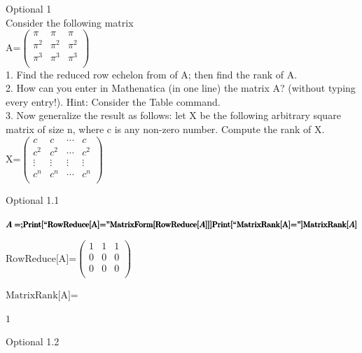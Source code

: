 \documentclass{article}
\begin{document}
Optional 1\\
Consider the following matrix\\
A=\(\left(
\begin{array}{ccc}
 \pi  & \pi  & \pi  \\
 \pi ^2 & \pi ^2 & \pi ^2 \\
 \pi ^3 & \pi ^3 & \pi ^3 \\
\end{array}
\right)\)\\
1. Find the reduced row echelon from of A; then find the rank of A.\\
2. How can you enter in Mathenatica (in one line) the matrix A? (without typing every entry!). Hint: Consider the Table command.\\
3. Now generalize the result as follows: let X be the following arbitrary square matrix of size n, where c is any non-zero number. Compute the rank
of X.\\
X=\(\left(
\begin{array}{cccc}
 c & c & \cdots  & c \\
 c^2 & c^2 & \cdots  & c^2 \\
 \vdots  & \vdots  & \vdots  & \vdots  \\
 c^n & c^n & \cdots  & c^n \\
\end{array}
\right)\)

Optional 1.1

\begin{doublespace}
\noindent\(\pmb{A=;}\\
\pmb{\text{Print}[\text{{``}RowReduce[A]={''}} \text{MatrixForm}[\text{RowReduce}[A]]]}\\
\pmb{\text{Print}[\text{{``}MatrixRank[A]={''}}]}\\
\pmb{\text{MatrixRank}[A]}\)
\end{doublespace}

\noindent\(\text{RowReduce[A]=} \left(
\begin{array}{ccc}
 1 & 1 & 1 \\
 0 & 0 & 0 \\
 0 & 0 & 0 \\
\end{array}
\right)\)

\noindent\(\text{MatrixRank[A]=}\)

\begin{doublespace}
\noindent\(1\)
\end{doublespace}

Optional 1.2
\end{document}

